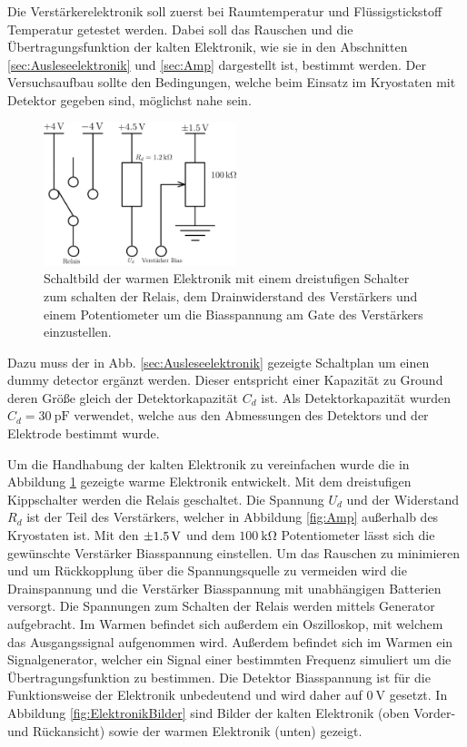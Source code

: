 Die Verstärkerelektronik soll zuerst bei Raumtemperatur und Flüssigstickstoff Temperatur getestet werden.
Dabei soll das Rauschen und die Übertragungsfunktion der kalten Elektronik, wie sie in den Abschnitten \ref{sec:Ausleseelektronik} und \ref{sec:Amp} dargestellt ist, bestimmt werden.
Der Versuchsaufbau sollte den Bedingungen, welche beim Einsatz im Kryostaten mit Detektor gegeben sind, möglichst nahe sein.
\begin{figure}[!t]
\begin{center}
\includegraphics[width=0.5\textwidth]{./fig/Box.pdf}
\vspace{-0.5cm}
\caption{Schaltbild der warmen Elektronik mit einem dreistufigen Schalter zum schalten der Relais, dem Drainwiderstand des Verstärkers und einem Potentiometer um die Biasspannung am Gate des Verstärkers einzustellen.}
\label{fig:WarmeElektronik}
\end{center}
\end{figure}
Dazu muss der in Abb. \ref{sec:Ausleseelektronik} gezeigte Schaltplan um einen dummy detector ergänzt werden.
Dieser entspricht einer Kapazität zu Ground deren Größe gleich der Detektorkapazität $C_d$ ist.
Als Detektorkapazität wurden $C_d=\SI{30}{\pico\farad}$ verwendet, welche aus den Abmessungen des Detektors und der Elektrode bestimmt wurde.

Um die Handhabung der kalten Elektronik zu vereinfachen wurde die in Abbildung \ref{fig:WarmeElektronik} gezeigte warme Elektronik entwickelt.
Mit dem dreistufigen Kippschalter werden die Relais geschaltet.
Die Spannung $U_d$ und der Widerstand $R_d$ ist der Teil des Verstärkers, welcher in Abbildung \ref{fig:Amp} außerhalb des Kryostaten ist.
Mit den $\SI{\pm 1.5}{\volt}$ und dem $\SI{100}{\kilo\ohm}$ Potentiometer lässt sich die gewünschte Verstärker Biasspannung einstellen.
Um das Rauschen zu minimieren und um Rückkopplung über die Spannungsquelle zu vermeiden wird die Drainspannung und die Verstärker Biasspannung mit unabhängigen Batterien versorgt.
Die Spannungen zum Schalten der Relais werden mittels Generator aufgebracht.
Im Warmen befindet sich außerdem ein Oszilloskop, mit welchem das Ausgangssignal aufgenommen wird.
Außerdem befindet sich im Warmen ein Signalgenerator, welcher ein Signal einer bestimmten Frequenz simuliert um die Übertragungsfunktion zu bestimmen.
Die Detektor Biasspannung ist für die Funktionsweise der Elektronik unbedeutend und wird daher auf $\SI{0}{\volt}$ gesetzt.
In Abbildung \ref{fig:ElektronikBilder} sind Bilder der kalten Elektronik (oben Vorder- und Rückansicht) sowie der warmen Elektronik (unten) gezeigt.

